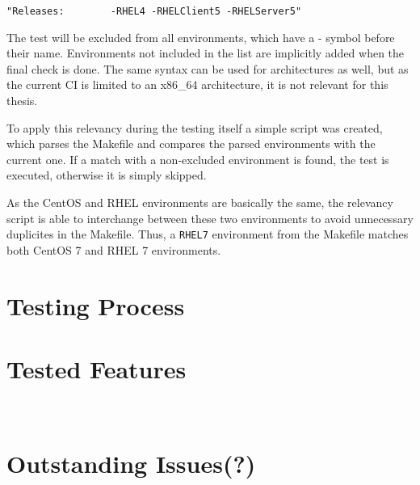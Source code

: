     \begin{lstlisting}
"Releases:        -RHEL4 -RHELClient5 -RHELServer5"
    \end{lstlisting}

    The test will be excluded from all environments, which have a - symbol
    before their name. Environments not included in the list are implicitly
    added when the final check is done. The same syntax can be used for
    architectures as well, but as the current CI is limited to an x86\_64
    architecture, it is not relevant for this thesis.

    To apply this relevancy during the testing itself a simple script was
    created, which parses the Makefile and compares the parsed environments
    with the current one. If a match with a non-excluded environment is found,
    the test is executed, otherwise it is simply skipped.

    As the CentOS and RHEL environments are basically the same, the relevancy
    script is able to interchange between these two environments to avoid
    unnecessary duplicites in the Makefile. Thus, a \texttt{RHEL7} environment
    from the Makefile matches both CentOS 7 and RHEL 7 environments.

\section{Testing Process}

\section{Tested Features}
     \\

\section{Outstanding Issues(?)}
     \\

